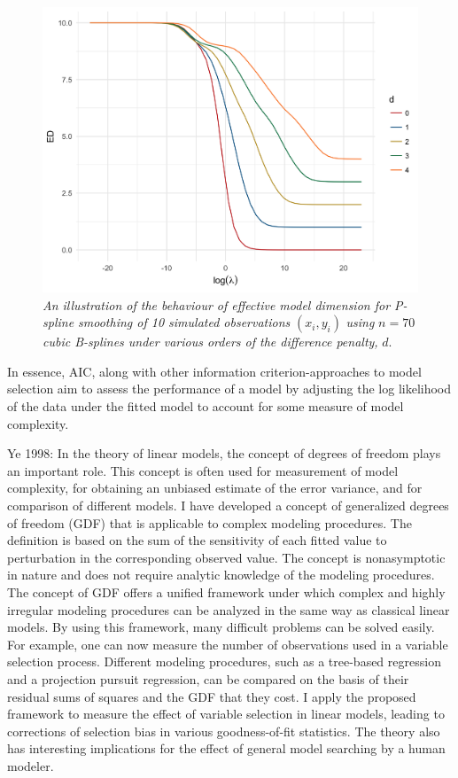 \documentclass[12pt]{article}
\theoremstyle{definition}
\begin{document}
\begin{figure}[H]
\centering
 \graphicspath{{img/}}
  \includegraphics[scale=0.27]{"model selection/PS_ED_section_figure_3"}
 \caption{\textit{An illustration of the behaviour of effective model dimension for P-spline smoothing of 10 simulated observations} $\left(x_i,y_i\right)$ \textit{using} $n=70$ \textit{cubic B-splines under various orders of the difference penalty,} $d$.}
\end{figure}




In essence, AIC, along with other information criterion-approaches to model selection aim to assess the performance of a model by adjusting the log likelihood of the data under the fitted model to account for some measure of model complexity. 





Ye 1998: In the theory of linear models, the concept of degrees of freedom plays an important role. This concept is often used for measurement
of model complexity, for obtaining an unbiased estimate of the error variance, and for comparison of different models.
I have developed a concept of generalized degrees of freedom (GDF) that is applicable to complex modeling procedures. The
definition is based on the sum of the sensitivity of each fitted value to perturbation in the corresponding observed value. The
concept is nonasymptotic in nature and does not require analytic knowledge of the modeling procedures. The concept of GDF
offers a unified framework under which complex and highly irregular modeling procedures can be analyzed in the same way as
classical linear models. By using this framework, many difficult problems can be solved easily. For example, one can now measure
the number of observations used in a variable selection process. Different modeling procedures, such as a tree-based regression
and a projection pursuit regression, can be compared on the basis of their residual sums of squares and the GDF that they cost.
I apply the proposed framework to measure the effect of variable selection in linear models, leading to corrections of selection
bias in various goodness-of-fit statistics. The theory also has interesting implications for the effect of general model searching by
a human modeler. 
\end{document}
